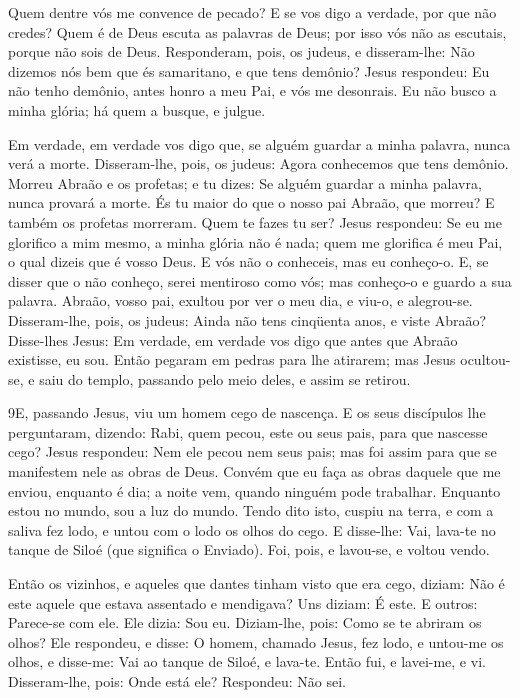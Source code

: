 Quem dentre vós me convence de pecado? E se vos digo a verdade,
por que não credes? Quem é de Deus escuta as palavras de
Deus; por isso vós não as escutais, porque não sois de Deus.
Responderam, pois, os judeus, e disseram-lhe: Não dizemos nós
bem que és samaritano, e que tens demônio? Jesus respondeu:
Eu não tenho demônio, antes honro a meu Pai, e vós me desonrais.
Eu não busco a minha glória; há quem a busque, e julgue.

Em verdade, em verdade vos digo que, se alguém guardar a minha
palavra, nunca verá a morte. Disseram-lhe, pois, os judeus:
Agora conhecemos que tens demônio. Morreu Abraão e os profetas; e tu
dizes: Se alguém guardar a minha palavra, nunca provará a morte.
És tu maior do que o nosso pai Abraão, que morreu? E também
os profetas morreram. Quem te fazes tu ser? Jesus respondeu:
Se eu me glorifico a mim mesmo, a minha glória não é nada; quem me
glorifica é meu Pai, o qual dizeis que é vosso Deus. E vós
não o conheceis, mas eu conheço-o. E, se disser que o não conheço,
serei mentiroso como vós; mas conheço-o e guardo a sua palavra.
Abraão, vosso pai, exultou por ver o meu dia, e viu-o, e
alegrou-se. Disseram-lhe, pois, os judeus: Ainda não tens
cinqüenta anos, e viste Abraão? Disse-lhes Jesus: Em verdade,
em verdade vos digo que antes que Abraão existisse, eu sou.
Então pegaram em pedras para lhe atirarem; mas Jesus
ocultou-se, e saiu do templo, passando pelo meio deles, e assim se
retirou.

\medskip

\lettrine{9} E, passando Jesus, viu um homem cego de nascença.
E os seus discípulos lhe perguntaram, dizendo: Rabi, quem pecou,
este ou seus pais, para que nascesse cego? Jesus respondeu: Nem
ele pecou nem seus pais; mas foi assim para que se manifestem nele
as obras de Deus. Convém que eu faça as obras daquele que me
enviou, enquanto é dia; a noite vem, quando ninguém pode trabalhar.
Enquanto estou no mundo, sou a luz do mundo. Tendo dito
isto, cuspiu na terra, e com a saliva fez lodo, e untou com o lodo
os olhos do cego. E disse-lhe: Vai, lava-te no tanque de Siloé
(que significa o Enviado). Foi, pois, e lavou-se, e voltou vendo.

Então os vizinhos, e aqueles que dantes tinham visto que era cego,
diziam: Não é este aquele que estava assentado e mendigava? Uns
diziam: É este. E outros: Parece-se com ele. Ele dizia: Sou eu.
Diziam-lhe, pois: Como se te abriram os olhos? Ele
respondeu, e disse: O homem, chamado Jesus, fez lodo, e untou-me os
olhos, e disse-me: Vai ao tanque de Siloé, e lava-te. Então fui, e
lavei-me, e vi. Disseram-lhe, pois: Onde está ele? Respondeu:
Não sei.

